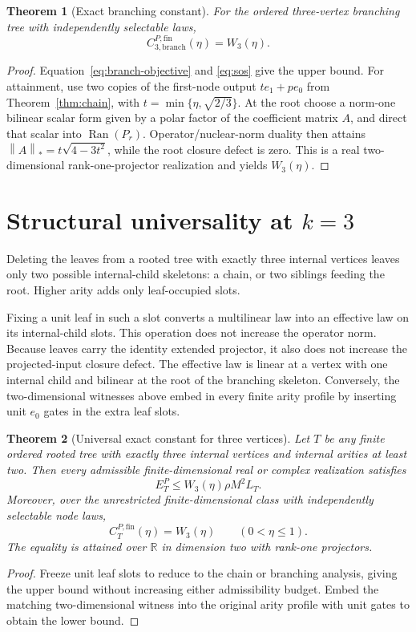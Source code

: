 \documentclass[11pt]{article}
\newtheorem{theorem}{Theorem}[section]
\theoremstyle{definition}
\newcommand{\R}{\mathbb{R}}
\newcommand{\Ran}{\operatorname{Ran}}
\newcommand{\fin}{\mathrm{fin}}
\newcommand{\norm}[1]{\left\lVert #1\right\rVert}
\begin{document}
\begin{theorem}[Exact branching constant]\label{thm:branch}
For the ordered three-vertex branching tree with independently selectable
laws,
\[
 C_{3,\mathrm{branch}}^{P,\fin}(\eta)=W_3(\eta).
\]
\end{theorem}
\begin{proof}
Equation~\eqref{eq:branch-objective} and
\eqref{eq:sos} give the upper bound.  For attainment, use two copies of the
first-node output $te_1+pe_0$ from Theorem~\ref{thm:chain}, with
$t=\min\{\eta,\sqrt{2/3}\}$.  At the root choose a norm-one bilinear scalar
form given by a polar factor of the coefficient matrix $A$, and direct that
scalar into $\Ran(P_r)$.  Operator/nuclear-norm duality then attains
$\norm A_*=t\sqrt{4-3t^2}$, while the root closure defect is zero.  This is a
real two-dimensional rank-one-projector realization and yields $W_3(\eta)$.
\end{proof}

\section{Structural universality at \texorpdfstring{$k=3$}{k=3}}

Deleting the leaves from a rooted tree with exactly three internal vertices
leaves only two possible internal-child skeletons: a chain, or two siblings
feeding the root.  Higher arity adds only leaf-occupied slots.

Fixing a unit leaf in such a slot converts a multilinear law into an effective
law on its internal-child slots.  This operation does not increase the operator
norm.  Because leaves carry the identity extended projector, it also does not
increase the projected-input closure defect.  The effective law is linear at a
vertex with one internal child and bilinear at the root of the branching
skeleton.  Conversely, the two-dimensional witnesses above embed in every
finite arity profile by inserting unit $e_0$ gates in the extra leaf slots.

\begin{theorem}[Universal exact constant for three vertices]\label{thm:k3-universal}
Let $T$ be any finite ordered rooted tree with exactly three internal vertices
and internal arities at least two.  Then every admissible finite-dimensional
real or complex realization satisfies
\[
 E_T^P\le W_3(\eta)\rho M^2L_T.
\]
Moreover, over the unrestricted finite-dimensional class with independently
selectable node laws,
\begin{equation}\label{eq:k3-universal}
 \boxed{C_T^{P,\fin}(\eta)=W_3(\eta)\qquad(0<\eta\le1).}
\end{equation}
The equality is attained over $\R$ in dimension two with rank-one projectors.
\end{theorem}
\begin{proof}
Freeze unit leaf slots to reduce to the chain or branching analysis, giving the
upper bound without increasing either admissibility budget.  Embed the matching
two-dimensional witness into the original arity profile with unit gates to
obtain the lower bound.
\end{proof}
\end{document}
